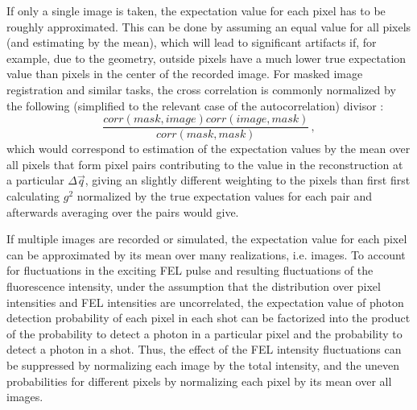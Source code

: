 If only a single image is taken, the expectation value for each pixel has to be roughly approximated. This can be done by assuming an equal value for all pixels (and estimating by the mean), which will lead to significant artifacts if, for example, due to the geometry, outside pixels have a much lower true expectation value than pixels in the center of the recorded image.  
For masked image registration and similar tasks, the cross correlation is commonly normalized by the following (simplified to the relevant case of the autocorrelation) divisor \cite{padfield2010}:
\begin{equation}
\frac{\mathit{corr}(\mathit{mask},\mathit{image}) \mathit{corr}(\mathit{image},\mathit{mask})}{\mathit{corr}(\mathit{mask},\mathit{mask})} \,,
\end{equation} which would correspond to estimation of the expectation values  by the mean over all pixels that form pixel pairs contributing to the value in the reconstruction at a particular $\Delta \vec{q}$, giving an slightly different weighting to the pixels than first first calculating $g^2$ normalized by the true expectation values for each pair and afterwards averaging over the pairs would give.

If multiple images are recorded or simulated, the expectation value for each pixel can be approximated by its mean over many realizations, i.e. images. To account for fluctuations in the exciting FEL pulse and resulting fluctuations of the fluorescence intensity, under the assumption that the distribution over pixel intensities and FEL intensities are uncorrelated, the expectation value of photon detection probability of each pixel in each shot can be factorized into the product of the probability to detect a photon in a particular pixel and the probability to detect a photon in a shot. Thus, the effect of the FEL intensity fluctuations can be suppressed by normalizing each image by the total intensity, and the uneven probabilities for different pixels by normalizing each pixel by its mean over all images. 




